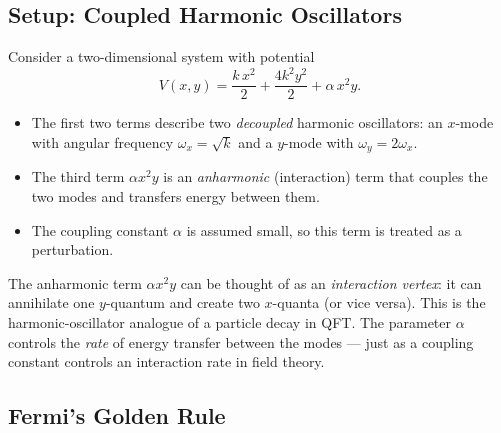 \subsection*{Setup: Coupled Harmonic Oscillators}

Consider a two-dimensional system with potential
\begin{equation}
  V(x,y)
  = \frac{k\,x^2}{2}
    + \frac{4k^2 y^2}{2}
    + \alpha\, x^2 y.
  \label{eq:lec04:potential}
\end{equation}

\begin{itemize}
  \item The first two terms describe two \emph{decoupled} harmonic oscillators: an $x$-mode with angular frequency $\omega_x = \sqrt{k}$ and a $y$-mode with $\omega_y = 2\omega_x$.
  \item The third term $\alpha x^2 y$ is an \emph{anharmonic} (interaction) term that couples the two modes and transfers energy between them.
  \item The coupling constant $\alpha$ is assumed small, so this term is treated as a perturbation.
\end{itemize}

\begin{remark}
The anharmonic term $\alpha x^2 y$ can be thought of as an \emph{interaction vertex}: it can annihilate one $y$-quantum and create two $x$-quanta (or vice versa).  This is the harmonic-oscillator analogue of a particle decay in QFT.  The parameter $\alpha$ controls the \emph{rate} of energy transfer between the modes — just as a coupling constant controls an interaction rate in field theory.
\end{remark}

\subsection*{Fermi's Golden Rule}


